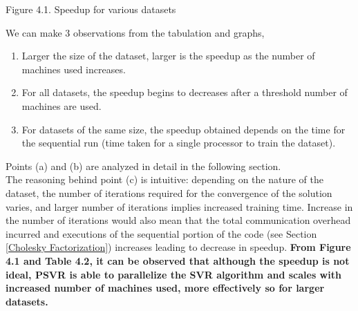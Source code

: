 \documentclass[12pt]{article}
\begin{document}
\newline
\centerline{Figure 4.1. Speedup for various datasets}
\newline\newline
We can make 3 observations from the tabulation and graphs,
\begin{enumerate}[label=(\alph*)]
\item Larger the size of the dataset, larger is the speedup as the number of machines used increases.
\item For all datasets, the speedup begins to decreases after a threshold number of machines are used.
\item For datasets of the same size, the speedup obtained depends on the time for the sequential run (time taken for a single processor to train the dataset).
\end{enumerate}
Points (a) and (b) are analyzed in detail in the following section.\\
The reasoning behind point (c) is intuitive: depending on the nature of the dataset, the number of iterations required for the convergence of the solution varies, and larger number of iterations implies increased training time. Increase in the number of iterations would also mean that the total communication overhead incurred and executions of the sequential portion of the code (see Section \ref{Cholesky Factorization}) increases leading to decrease in speedup.
\newline\newline
{\bf From Figure 4.1 and Table 4.2, it can be observed that although the speedup is not ideal, PSVR is able to parallelize the SVR algorithm and scales with increased number of machines used, more effectively so for larger datasets.}
\end{document}
